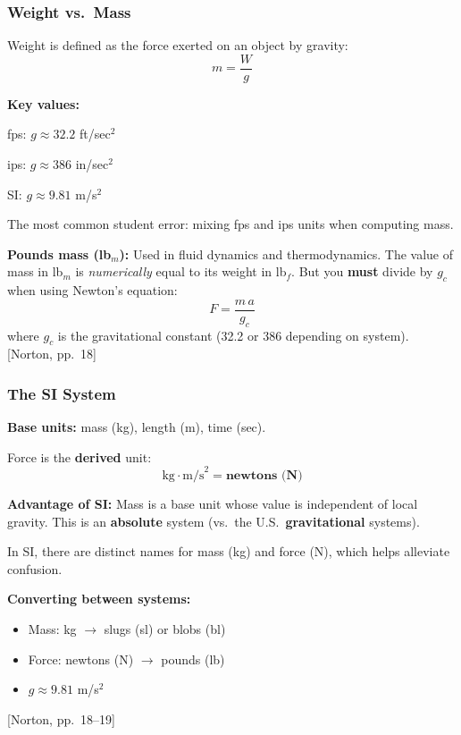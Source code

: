 \documentclass[10pt,aspectratio=43]{beamer}
\newcommand{\pref}[1]{\vfill\hfill{\scriptsize\color{gray}[Norton, pp.~#1]}}
\begin{document}
\begin{frame}
\frametitle{Weight vs.\ Mass}

Weight is defined as the force exerted on an object by gravity:
\[
  m = \frac{W}{g}
\]

\begin{yellowbox}
\textbf{Key values:}

fps: $g \approx 32.2$ ft/sec$^2$

ips: $g \approx 386$ in/sec$^2$

SI: $g \approx 9.81$ m/s$^2$
\end{yellowbox}

\vspace{4pt}
The most common student error: mixing fps and ips units when computing mass.

\vspace{6pt}
\textbf{Pounds mass (lb$_m$):} Used in fluid dynamics and thermodynamics. The value of mass in lb$_m$ is \emph{numerically} equal to its weight in lb$_f$. But you \textbf{must} divide by $g_c$ when using Newton's equation:
\[
  F = \frac{m\,a}{g_c}
\]
where $g_c$ is the gravitational constant (32.2 or 386 depending on system).
\pref{18}
\end{frame}

\begin{frame}
\frametitle{The SI System}

\textbf{Base units:} mass (kg), length (m), time (sec).

Force is the \textbf{derived} unit:
\[
  \text{kg} \cdot \text{m/s}^2 = \textbf{newtons (N)}
\]

\begin{yellowbox}
\textbf{Advantage of SI:} Mass is a base unit whose value is independent of local gravity. This is an \textbf{absolute} system (vs.\ the U.S.\ \textbf{gravitational} systems).

In SI, there are distinct names for mass (kg) and force (N), which helps alleviate confusion.
\end{yellowbox}

\vspace{6pt}
\textbf{Converting between systems:}
\begin{itemize}
  \item Mass: kg $\to$ slugs (sl) or blobs (bl)
  \item Force: newtons (N) $\to$ pounds (lb)
  \item $g \approx 9.81$ m/s$^2$
\end{itemize}
\pref{18--19}
\end{frame}
\end{document}
